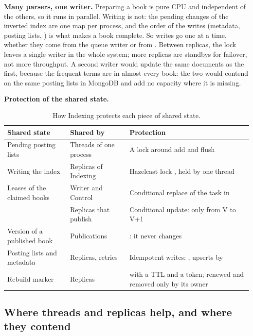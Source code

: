 \textbf{Many parsers, one writer.} Preparing a book is pure CPU and independent of the others, so it runs in parallel.
Writing is not: the pending changes of the inverted index are one map per process, and the order of the writes
(metadata, posting lists, ) is what makes a book complete. So writes go one at a time, whether they come
from the queue writer or from . Between replicas, the  lock leaves a single
writer in the whole system; more replicas are standbys for failover, not more throughput. A second writer would update
the same documents as the first, because the frequent terms are in almost every book: the two would contend on the same
posting lists in MongoDB and add no capacity where it is missing.

\textbf{Protection of the shared state.}

\begin{table}[H]
\centering\small
\begin{tabularx}{\linewidth}{@{}L{3.6cm}L{3.8cm}X@{}}
\toprule
\textbf{Shared state} & \textbf{Shared by} & \textbf{Protection} \\
\midrule
Pending posting lists & Threads of one process & A lock around add and flush \\
Writing the index & Replicas of Indexing & Hazelcast lock , held by one thread \\
Leases of the claimed books & Writer and Control & Conditional replace of the task in  \\
 & Replicas that publish & Conditional update: only from V to V+1 \\
Version of a published book & Publications & : it never changes \\
Posting lists and metadata & Replicas, retries & Idempotent writes: , upserts by  \\
Rebuild marker & Replicas &  with a TTL and a token; renewed and removed only by its owner \\
\bottomrule
\end{tabularx}
\caption{How Indexing protects each piece of shared state.}
\end{table}

\subsection{Where threads and replicas help, and where they contend}


